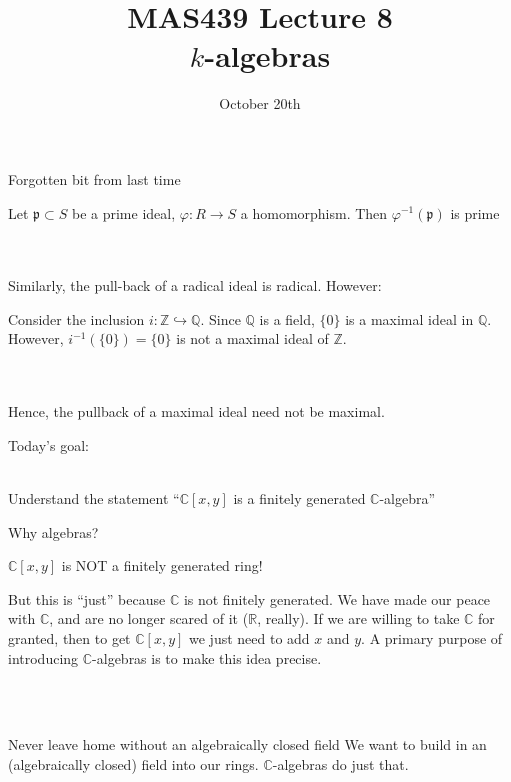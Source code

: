 \documentclass{beamer}
\title{MAS439 Lecture 8 \\ $k$-algebras}
\date{October 20th}
\newcommand{\C}{\mathbb{C}}
\newcommand{\Z}{\mathbb{Z}}
\newcommand{\R}{\mathbb{R}}
\newcommand{\Q}{\mathbb{Q}}
\begin{document}
\begin{frame}
\titlepage
\end{frame}





\begin{frame}{Forgotten bit from last time}

\begin{lemma} Let $\mathfrak{p}\subset S$ be a prime ideal, $\varphi:R\to S$ a homomorphism.  Then $\varphi^{-1}(\mathfrak{p})$ is prime
\end{lemma}


\\~\\

Similarly, the pull-back of a radical ideal is radical.  However:

\begin{example} Consider the inclusion $i:\mathbb{Z}\hookrightarrow\Q$.  Since $\Q$ is a field, $\{0\}$ is a maximal ideal in $\Q$.  However, $i^{-1}(\{0\})=\{0\}$ is not a maximal ideal of $\Z$.  
\end{example}
\\~\\
Hence, the pullback of a maximal ideal need not be maximal.
\end{frame}


\begin{frame}[plain, c]

\huge
\begin{center}


{ Today's goal: \\~\\}

Understand the statement ``$\C[x,y]$ is a finitely generated $\C$-algebra''

\end{center}
\end{frame}



\begin{frame}{Why algebras?}

\begin{block}{$\C[x,y]$ is \alert{NOT} a finitely generated ring!}


But this is ``just'' because $\C$ is not finitely generated.  We have made our peace with $\C$, and are no longer scared of it ($\R$, really).  If we are willing to take $\C$ for granted, then to get $\C[x,y]$ we just need to add $x$ and $y$. A primary purpose of introducing $\C$-algebras is to make this idea precise.  
\end{block}\\~\\
\begin{block}{Never leave home without an algebraically closed field} 
We want to build in an (algebraically closed) field into our rings. $\C$-algebras do just that.
\end{block}

 
\end{frame}
\end{document}

